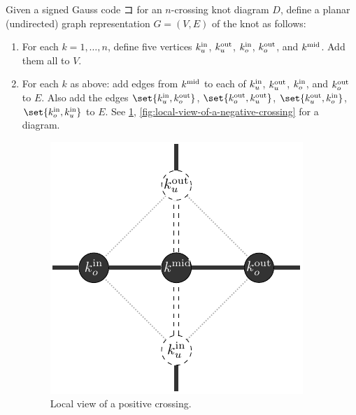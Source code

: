 \begin{definition}\label{def:diagram-graph}
  Given a signed Gauss code $コ$ for an $n$-crossing knot diagram $D$,
  define a planar (undirected) graph representation $G = (V, E)$ of
  the knot as follows:
  \begin{enumerate}[label=(\arabic*)]
    \item \hypertarget{graph-step-1}{} For each $k = 1, \ldots, n$,
      define five vertices $k_u^{\rm in}$, $k_u^{\rm out}$, $k_o^{\rm
      in}$, $k_o^{\rm out}$, and $k^{\rm mid}$. Add them all to $V$.
    \item \hypertarget{graph-step-2}{} For each $k$ as above: add
      edges from $k^{\rm mid}$ to each of $k_u^{\rm in}$, $k_u^{\rm
      out}$, $k_o^{\rm in}$, and $k_o^{\rm out}$ to $E$. Also add the
      edges $\set{k_u^{\rm in}, k_o^{\rm out}}$, $\set{k_o^{\rm out},
      k_u^{\rm out}}$, $\set{k_u^{\rm out}, k_o^{\rm in}}$,
      $\set{k_o^{\rm in}, k_u^{\rm in}}$ to $E$. See
      \cref{fig:local-view-of-a-positive-crossing},
      \cref{fig:local-view-of-a-negative-crossing} for a diagram.
      \begin{figure}[H]
        \centering
        \includegraphics[scale=.75]{figures/unknotting-moves-and-combinatorial-representations/positive-crossing.pdf}
        \caption{Local view of a positive crossing.}
        \label{fig:local-view-of-a-positive-crossing}
      \end{figure}
      \begin{figure}[H]
        \centering

\end{figure}
\end{enumerate}
\end{definition}
